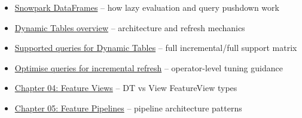 \documentclass[
  letterpaper,
  DIV=11,
  numbers=noendperiod]{scrreprt}
\providecommand{\tightlist}{%
  \setlength{\itemsep}{0pt}\setlength{\parskip}{0pt}}\usepackage{longtable,booktabs,array}
\begin{document}
\begin{itemize}
\tightlist
\item
  \href{https://docs.snowflake.com/en/developer-guide/snowpark/python/working-with-dataframes}{Snowpark
  DataFrames} -- how lazy evaluation and query pushdown work
\item
  \href{https://docs.snowflake.com/en/user-guide/dynamic-tables-about}{Dynamic
  Tables overview} -- architecture and refresh mechanics
\item
  \href{https://docs.snowflake.com/en/user-guide/dynamic-tables-supported-queries}{Supported
  queries for Dynamic Tables} -- full incremental/full support matrix
\item
  \href{https://docs.snowflake.com/en/user-guide/dynamic-tables-performance-optimize-query}{Optimise
  queries for incremental refresh} -- operator-level tuning guidance
\item
  \protect\hyperlink{feature-views}{Chapter 04: Feature Views} -- DT vs
  View FeatureView types
\item
  \protect\hyperlink{feature-pipelines}{Chapter 05: Feature Pipelines}
  -- pipeline architecture patterns
\end{itemize}
\end{document}

